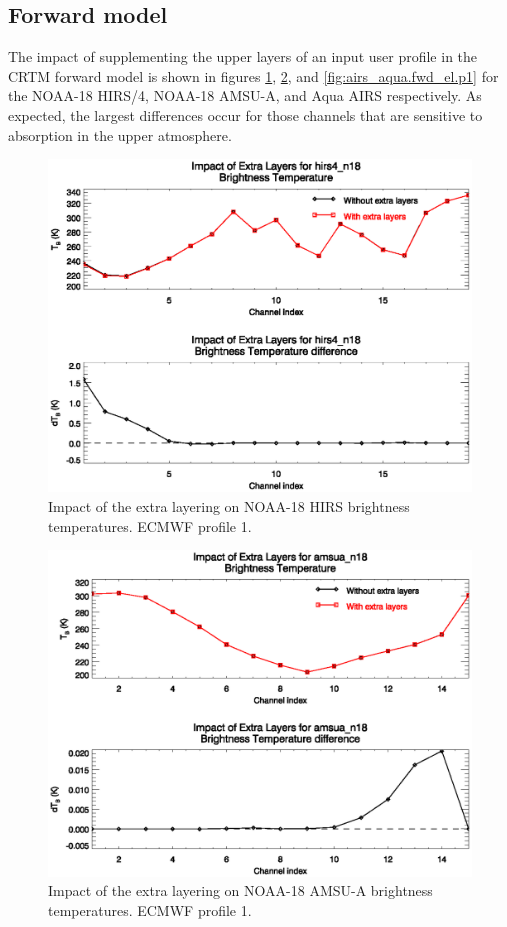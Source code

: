 \subsection{Forward model}
The impact of supplementing the upper layers of an input user profile in the CRTM forward model is shown in figures \ref{fig:hirs4_n18.fwd_el.p1}, \ref{fig:amsua_n18.fwd_el.p1}, and \ref{fig:airs_aqua.fwd_el.p1} for the NOAA-18 HIRS/4, NOAA-18 AMSU-A, and Aqua AIRS respectively. As expected, the largest differences occur for those channels that are sensitive to absorption in the upper atmosphere.
\begin{figure}[htp]
  \centering
  \includegraphics[scale=0.8]{graphics/hirs4_n18.fwd_el.p1.eps}
  \caption{Impact of the extra layering on NOAA-18 HIRS brightness temperatures. ECMWF profile 1.}
  \label{fig:hirs4_n18.fwd_el.p1}
\end{figure}
\begin{figure}[htp]
  \centering
  \includegraphics[scale=0.8]{graphics/amsua_n18.fwd_el.p1.eps}
  \caption{Impact of the extra layering on NOAA-18 AMSU-A brightness temperatures. ECMWF profile 1.}
  \label{fig:amsua_n18.fwd_el.p1}
\end{figure}
